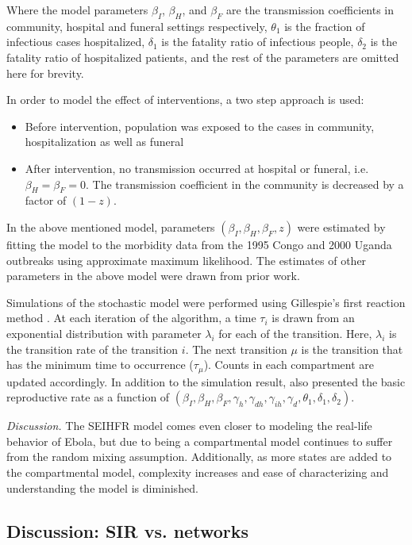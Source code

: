 \documentclass[10pt, journal,onecolumn]{IEEEtran}
\begin{document}
Where the model parameters $\beta_I$, $\beta_H$, and $\beta_F$ are the transmission
coefficients in community, hospital and funeral settings respectively, $\theta_1$ is the fraction of infectious
cases hospitalized, $\delta_1$ is the fatality ratio of infectious people, $\delta_2$ is the
fatality ratio of hospitalized patients, and the rest of the parameters are omitted here for brevity.

In order to model the effect of interventions, a two step approach is used:

\begin{itemize}
\item Before intervention, population was exposed to the cases in community, hospitalization as well as funeral
\item After intervention, no transmission occurred at hospital or funeral, i.e. $\beta_H = \beta_F = 0$. The transmission coefficient in the community is decreased by a factor of $(1-z)$.
\end{itemize}

In the above mentioned model, parameters $(\beta_I, \beta_H, \beta_F , z)$ were estimated by fitting
the model to the morbidity data from the 1995 Congo and 2000 Uganda outbreaks using approximate maximum
likelihood. The estimates of other parameters in the above model were drawn from prior work.

Simulations of the stochastic model were performed using Gillespie's first reaction method \citep{gillespie1976general}. At each iteration of the algorithm, a time $\tau_i$ is drawn from an exponential distribution with parameter $\lambda_i$ for each of the transition. Here, $\lambda_i$ is the transition rate of the transition $i$. The next transition $\mu$ is the transition that has the minimum time to occurrence ($\tau_\mu$). Counts in each compartment are updated accordingly. In addition to the simulation result,  \citep{legrand2007understanding} also presented the basic reproductive rate as a function of $(\beta_I,\beta_H,\beta_F,\gamma_h,\gamma_{dh},\gamma_{ih},\gamma_d,\theta_1,\delta_1,\delta_2)$.

\textit{Discussion.} The SEIHFR model comes even closer to modeling the real-life behavior of Ebola,
but due to being a compartmental model continues to suffer from the random mixing assumption.
Additionally, as more states are added to the compartmental model, complexity increases and ease of
characterizing and understanding the model is diminished.

\subsection{\textbf{Discussion: SIR \citep{chowell2004basic, legrand2007understanding} vs. networks \citep{newman2002spread}}}
\end{document}
